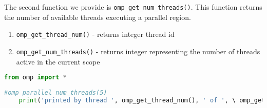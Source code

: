 \documentclass[letterpaper,12pt]{article} %
\begin{document}
The second function we provide is \texttt{omp\_get\_num\_threads()}. This function returns the number of available threads executing a parallel region.

\begin{enumerate}
\item \texttt{omp\_get\_thread\_num()} - returns integer thread id
\item \texttt{omp\_get\_num\_threads()} - returns integer representing the number of threads active in the current scope
\end{enumerate}

 \begin{lstlisting}[language=Python]
 from omp import *
 
#omp parallel num_threads(5)
	print('printed by thread ', omp_get_thread_num(), ' of ', \ omp_get_num_threads())
\end{lstlisting}
\end{document}
